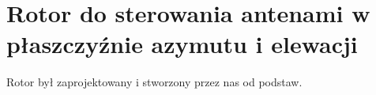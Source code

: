 \section{Rotor do sterowania antenami w płaszczyźnie azymutu i elewacji}

Rotor był zaprojektowany i stworzony przez nas od podstaw. 
